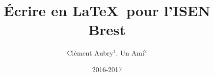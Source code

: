 \documentclass[french,svgnames,10pt]{beamer}
\title{Écrire en \LaTeX\ pour l'ISEN Brest}
\author[C.Aubry, Un.Ami]{Cl\'{e}ment Aubry$^{\text{1}}$, Un Ami$^{\text{2}}$}%
\institute[]{ISEN Brest$^{\text{1}}$, Autre École$^{\text{2}}$}
\date{2016-2017}
\begin{document}
\begin{frame}[plain,b]
 \titlepage
\end{frame}
%
%
%
%

\end{document}
